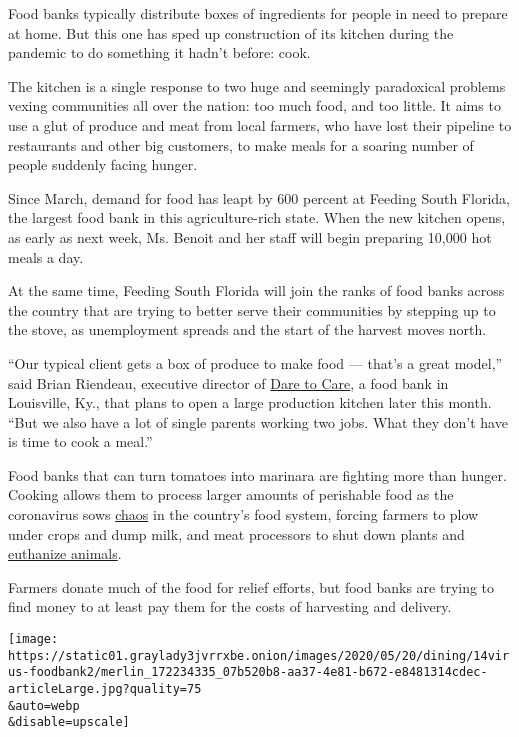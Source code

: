 Food banks typically distribute boxes of ingredients for people in need
to prepare at home. But this one has sped up construction of its kitchen
during the pandemic to do something it hadn't before: cook.

The kitchen is a single response to two huge and seemingly paradoxical
problems vexing communities all over the nation: too much food, and too
little. It aims to use a glut of produce and meat from local farmers,
who have lost their pipeline to restaurants and other big customers, to
make meals for a soaring number of people suddenly facing hunger.

Since March, demand for food has leapt by 600 percent at Feeding South
Florida, the largest food bank in this agriculture-rich state. When the
new kitchen opens, as early as next week, Ms. Benoit and her staff will
begin preparing 10,000 hot meals a day.

At the same time, Feeding South Florida will join the ranks of food
banks across the country that are trying to better serve their
communities by stepping up to the stove, as unemployment spreads and the
start of the harvest moves north.

``Our typical client gets a box of produce to make food --- that's a
great model,'' said Brian Riendeau, executive director of
\href{https://daretocare.org/}{Dare to Care}, a food bank in Louisville,
Ky., that plans to open a large production kitchen later this month.
``But we also have a lot of single parents working two jobs. What they
don't have is time to cook a meal.''

Food banks that can turn tomatoes into marinara are fighting more than
hunger. Cooking allows them to process larger amounts of perishable food
as the coronavirus sows
\href{https://www.nytimes3xbfgragh.onion/2020/05/02/business/coronavirus-food-waste-destroyed.html}{chaos}
in the country's food system, forcing farmers to plow under crops and
dump milk, and meat processors to shut down plants and
\href{https://www.nytimes3xbfgragh.onion/2020/05/14/business/coronavirus-farmers-killing-pigs.html}{euthanize
animals}.

Farmers donate much of the food for relief efforts, but food banks are
trying to find money to at least pay them for the costs of harvesting
and delivery.

\texttt{[image: https://static01.graylady3jvrrxbe.onion/images/2020/05/20/dining/14virus-foodbank2/merlin\_172234335\_07b520b8-aa37-4e81-b672-e8481314cdec-articleLarge.jpg?quality=75\\\&auto=webp\\\&disable=upscale]}


